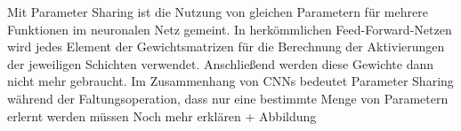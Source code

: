 Mit Parameter Sharing ist die Nutzung von gleichen Parametern für mehrere Funktionen im neuronalen Netz gemeint. In herkömmlichen Feed-Forward-Netzen wird jedes Element der Gewichtsmatrizen für die Berechnung der Aktivierungen der jeweiligen Schichten verwendet. Anschließend werden diese Gewichte dann nicht mehr gebraucht. Im Zusammenhang von CNNs bedeutet Parameter Sharing während der Faltungsoperation, dass nur eine bestimmte Menge von Parametern erlernt werden müssen
Noch mehr erklären + Abbildung

